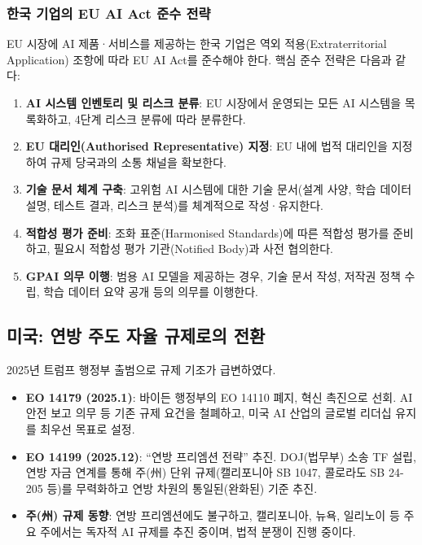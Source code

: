 \subsubsection{한국 기업의 EU AI Act 준수 전략}

EU 시장에 AI 제품·서비스를 제공하는 한국 기업은 역외 적용(Extraterritorial Application) 조항에 따라 EU AI Act를 준수해야 한다. 핵심 준수 전략은 다음과 같다:

\begin{enumerate}
 \item \textbf{AI 시스템 인벤토리 및 리스크 분류}: EU 시장에서 운영되는 모든 AI 시스템을 목록화하고, 4단계 리스크 분류에 따라 분류한다.
 \item \textbf{EU 대리인(Authorised Representative) 지정}: EU 내에 법적 대리인을 지정하여 규제 당국과의 소통 채널을 확보한다.
 \item \textbf{기술 문서 체계 구축}: 고위험 AI 시스템에 대한 기술 문서(설계 사양, 학습 데이터 설명, 테스트 결과, 리스크 분석)를 체계적으로 작성·유지한다.
 \item \textbf{적합성 평가 준비}: 조화 표준(Harmonised Standards)에 따른 적합성 평가를 준비하고, 필요시 적합성 평가 기관(Notified Body)과 사전 협의한다.
 \item \textbf{GPAI 의무 이행}: 범용 AI 모델을 제공하는 경우, 기술 문서 작성, 저작권 정책 수립, 학습 데이터 요약 공개 등의 의무를 이행한다.
\end{enumerate}

\subsection{미국: 연방 주도 자율 규제로의 전환}
2025년 트럼프 행정부 출범으로 규제 기조가 급변하였다.
\begin{itemize}
 \item \textbf{EO 14179 (2025.1)}: 바이든 행정부의 EO 14110 폐지, 혁신 촉진으로 선회. AI 안전 보고 의무 등 기존 규제 요건을 철폐하고, 미국 AI 산업의 글로벌 리더십 유지를 최우선 목표로 설정.
 \item \textbf{EO 14199 (2025.12)}: ``연방 프리엠션 전략'' 추진. DOJ(법무부) 소송 TF 설립, 연방 자금 연계를 통해 주(州) 단위 규제(캘리포니아 SB 1047, 콜로라도 SB 24-205 등)를 무력화하고 연방 차원의 통일된(완화된) 기준 추진.
 \item \textbf{주(州) 규제 동향}: 연방 프리엠션에도 불구하고, 캘리포니아, 뉴욕, 일리노이 등 주요 주에서는 독자적 AI 규제를 추진 중이며, 법적 분쟁이 진행 중이다.
\end{itemize}

